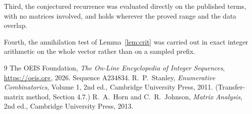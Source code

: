 \documentclass[11pt,a4paper]{article}
\theoremstyle{plain}
\theoremstyle{definition}
\begin{document}
Third, the conjectured recurrence was evaluated directly on the published terms, with no
matrices involved, and holds wherever the proved range and the data overlap.

Fourth, the annihilation test of Lemma~\ref{lem:crit} was carried out in exact integer
arithmetic on the whole vector rather than on a sampled prefix.

\begin{thebibliography}{9}
 The OEIS Foundation, \emph{The On-Line Encyclopedia of Integer
Sequences}, \url{https://oeis.org}, 2026. Sequence A234834.
 R.~P.~Stanley, \emph{Enumerative Combinatorics}, Volume 1, 2nd ed.,
Cambridge University Press, 2011. (Transfer-matrix method, Section 4.7.)
 R.~A.~Horn and C.~R.~Johnson, \emph{Matrix Analysis}, 2nd ed., Cambridge
University Press, 2013.
\end{thebibliography}
\end{document}
